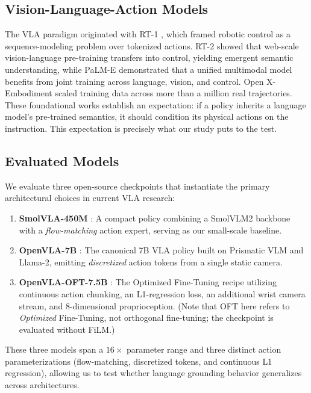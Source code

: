 \documentclass[11pt]{article}
\begin{document}
\subsection{Vision-Language-Action Models}
The VLA paradigm originated with RT-1 \citep{brohan2022rt1}, which framed robotic control as a sequence-modeling problem over tokenized actions. RT-2 \citep{brohan2023rt2} showed that web-scale vision-language pre-training transfers into control, yielding emergent semantic understanding, while PaLM-E \citep{driess2023palm} demonstrated that a unified multimodal model benefits from joint training across language, vision, and control. Open X-Embodiment \citep{open_x_embodiment_rt_x_2023} scaled training data across more than a million real trajectories. These foundational works establish an expectation: if a policy inherits a language model's pre-trained semantics, it should condition its physical actions on the instruction. This expectation is precisely what our study puts to the test.

\subsection{Evaluated Models}
We evaluate three open-source checkpoints that instantiate the primary architectural choices in current VLA research:
\begin{enumerate}
    \item \textbf{SmolVLA-450M} \citep{shukor2025smolvla}: A compact policy combining a SmolVLM2 backbone with a \emph{flow-matching} action expert, serving as our small-scale baseline.
    \item \textbf{OpenVLA-7B} \citep{kim2025openvla}: The canonical 7B VLA policy built on Prismatic VLM and Llama-2, emitting \emph{discretized} action tokens from a single static camera.
    \item \textbf{OpenVLA-OFT-7.5B} \citep{kim2025oft}: The Optimized Fine-Tuning recipe utilizing continuous action chunking, an L1-regression loss, an additional wrist camera stream, and 8-dimensional proprioception. (Note that OFT here refers to \emph{Optimized} Fine-Tuning, not orthogonal fine-tuning; the checkpoint is evaluated without FiLM.)
\end{enumerate}

These three models span a $16\times$ parameter range and three distinct action parameterizations (flow-matching, discretized tokens, and continuous L1 regression), allowing us to test whether language grounding behavior generalizes across architectures.
\end{document}
